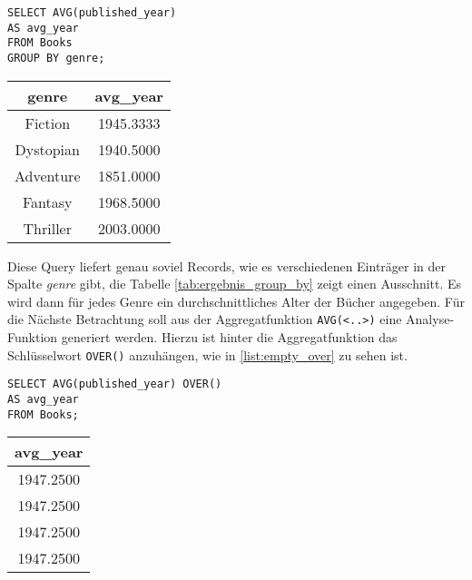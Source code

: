 \begin{minipage}{0.55\textwidth}
	 \begin{lstlisting}
SELECT AVG(published_year)
AS avg_year
FROM Books
GROUP BY genre;
	\end{lstlisting}
\end{minipage}
\hfill
\begin{minipage}{0.45\textwidth}
	\centering
	\begin{tabular}{|c|c|}
		\hline
		\textbf{genre} & \textbf{avg\_year} \\
		\hline
		Fiction        & 1945.3333          \\
		\hline
		Dystopian      & 1940.5000          \\
		\hline
		Adventure      & 1851.0000          \\
		\hline
		Fantasy        & 1968.5000          \\
		\hline
		Thriller       & 2003.0000          \\
		\hline
	\end{tabular}
	 \label{tab:ergebnis_group_by}
\end{minipage}

Diese Query liefert genau soviel Records, wie es verschiedenen Einträger in der
Spalte \textit{genre} gibt, die Tabelle \ref{tab:ergebnis_group_by} zeigt einen
Ausschnitt. Es wird dann für jedes Genre ein durchschnittliches Alter der Bücher
angegeben. Für die Nächste Betrachtung soll aus der Aggregatfunktion \texttt{AVG(<..>)}
eine Analyse-Funktion generiert werden. Hierzu ist hinter die Aggregatfunktion
das Schlüsselwort \texttt{OVER()} anzuhängen, wie in \ref{list:empty_over} zu
sehen ist.

\begin{minipage}{0.60\textwidth}
	 \begin{lstlisting}
SELECT AVG(published_year) OVER()
AS avg_year
FROM Books;
	\end{lstlisting}
\end{minipage}
\hfill
\begin{minipage}{0.45\textwidth}
	\centering
	\begin{tabular}{|c|}
		\hline
		\textbf{avg\_year} \\
		\hline
		1947.2500          \\
		\hline
		1947.2500          \\
		\hline
		1947.2500          \\
		\hline
		1947.2500          \\
		\hline
	\end{tabular}
	 \label{tab:ergebnis_over}
\end{minipage}

